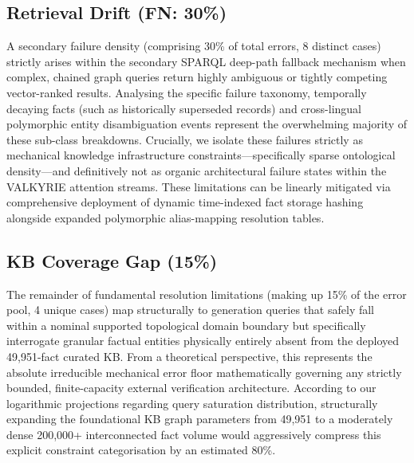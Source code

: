 \documentclass[10pt,journal,compsoc]{IEEEtran}
\begin{document}
\subsection{Retrieval Drift (FN: 30\%)}
A secondary failure density (comprising 30\% of total errors, 8 distinct cases) strictly arises within the secondary SPARQL deep-path fallback mechanism when complex, chained graph queries return highly ambiguous or tightly competing vector-ranked results. Analysing the specific failure taxonomy, temporally decaying facts (such as historically superseded records) and cross-lingual polymorphic entity disambiguation events represent the overwhelming majority of these sub-class breakdowns. Crucially, we isolate these failures strictly as mechanical knowledge infrastructure constraints---specifically sparse ontological density---and definitively not as organic architectural failure states within the VALKYRIE attention streams. These limitations can be linearly mitigated via comprehensive deployment of dynamic time-indexed fact storage hashing alongside expanded polymorphic alias-mapping resolution tables.

\subsection{KB Coverage Gap (15\%)}
The remainder of fundamental resolution limitations (making up 15\% of the error pool, 4 unique cases) map structurally to generation queries that safely fall within a nominal supported topological domain boundary but specifically interrogate granular factual entities physically entirely absent from the deployed 49,951-fact curated KB. From a theoretical perspective, this represents the absolute irreducible mechanical error floor mathematically governing any strictly bounded, finite-capacity external verification architecture. According to our logarithmic projections regarding query saturation distribution, structurally expanding the foundational KB graph parameters from 49,951 to a moderately dense 200,000+ interconnected fact volume would aggressively compress this explicit constraint categorisation by an estimated 80\%.
\end{document}
